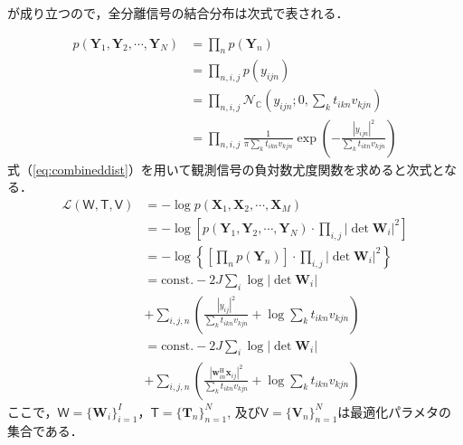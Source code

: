 \documentclass[10.5pt]{jarticle}
\begin{document}
が成り立つので，全分離信号の結合分布は次式で表される．{
\begin{align}
    \nonumber p(\bm{Y}_1, \bm{Y}_2, \cdots, \bm{Y}_N) &= \prod_n p(\bm{Y}_n) \\
\nonumber &= \prod_{n, i, j} p(y_{ijn}) \\
\nonumber &= \prod_{n, i, j} \mathcal{N}_{\mathbb{C}} \left(y_{ijn}; 0, \sum_k t_{ikn}v_{kjn} \right) \\
&= \prod_{n, i, j} \frac{1}{\pi \sum_k t_{ikn}v_{kjn}} \exp \left( -\frac{|y_{ijn}|^2}{\sum_k t_{ikn}v_{kjn}} \right) \label{eq:combineddist}
\end{align}
式（\ref{eq:combineddist}）を用いて観測信号の負対数尤度関数を求めると次式となる．
\begin{align}
　　\nonumber \mathcal{L}(\mathsf{W, T, V}) &= - \log p(\bm{X}_1, \bm{X}_2, \cdots, \bm{X}_M) \\
    \nonumber &= -\log \left[p(\bm{Y}_1, \bm{Y}_2, \cdots, \bm{Y}_N) \cdot \prod_{i, j} |\det \bm{W}_i|^2\right] \\
    \nonumber &= -\log \left \{ \left[\prod_n p(\bm{Y}_n) \right] \cdot \prod_{i, j} |\det \bm{W}_i|^2\right \} \\
    \nonumber &= \mathrm{const.}- 2J \sum_{i}  \log |\det \bm{W}_i| \\
    \nonumber &+ \sum_{i,j,n} \left( \frac{|y_{ij}|^2}{\sum_k t_{ikn} v_{kjn}} + \log \sum_k t_{ikn} v_{kjn}\right) \\
    \nonumber &= \mathrm{const.}-2J \sum_i \log | \det \bm{W}_i | \\
    &+ \sum_{i,j,n} \left( \frac{|\bm{w}_{in}^{\mathrm{H}}\bm{x}_{ij}|^2}{\sum_k t_{ikn}v_{kjn}} + \log \sum_k t_{ikn}v_{kjn} \right)
    \label{eq:ilrmalike2}
\end{align}
ここで，$\mathsf{W}=\{ \bm{W}_i \}_{i=1}^I$，$\mathsf{T}=\{ \bm{T}_n \}_{n=1}^N$, 及び$\mathsf{V}=\{ \bm{V}_n \}_{n=1}^N$は最適化パラメタの集合である．

}
\end{document}
